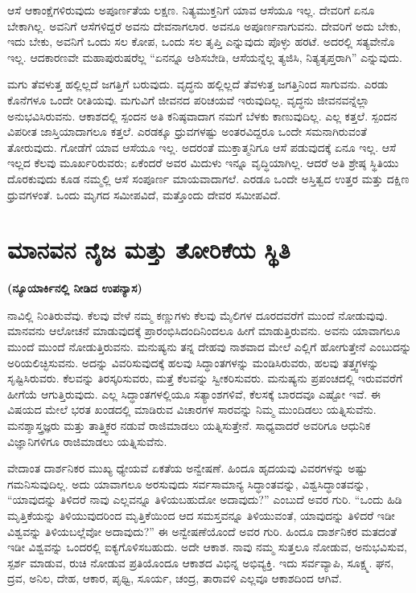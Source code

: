 ಆಸೆ ಆಕಾಂಕ್ಷೆಗಳಿರುವುದು ಅಪೂರ್ಣತೆಯ ಲಕ್ಷಣ. ನಿತ್ಯಮುಕ್ತನಿಗೆ ಯಾವ ಆಸೆಯೂ ಇಲ್ಲ. ದೇವರಿಗೆ ಏನೂ ಬೇಕಾಗಿಲ್ಲ. ಅವನಿಗೆ ಆಸೆಗಳಿದ್ದರೆ ಅವನು ದೇವನಾಗಲಾರ. ಅವನೂ ಅಪೂರ್ಣನಾಗುವನು. ದೇವರಿಗೆ ಅದು ಬೇಕು, ಇದು ಬೇಕು, ಅವನಿಗೆ ಒಂದು ಸಲ ಕೋಪ, ಒಂದು ಸಲ ತೃಪ್ತಿ ಎನ್ನುವುದು ಪೊಳ್ಳು ಹರಟೆ. ಅದರಲ್ಲಿ ಸತ್ಯವೇನೊ ಇಲ್ಲ. ಆದಕಾರಣವೇ ಮಹಾಪುರುಷರೆಲ್ಲ “ಏನನ್ನೂ ಆಶಿಸಬೇಡಿ, ಆಸೆಯನ್ನೆಲ್ಲ ತ್ಯಜಿಸಿ, ನಿತ್ಯತೃಪ್ತರಾಗಿ” ಎನ್ನುವುದು.

ಮಗು ತೆವಳುತ್ತ ಹಲ್ಲಿಲ್ಲದೆ ಜಗತ್ತಿಗೆ ಬರುವುದು. ವೃದ್ಧನು ಹಲ್ಲಿಲ್ಲದೆ ತೆವಳುತ್ತ ಜಗತ್ತಿನಿಂದ ಸಾಗುವನು. ಎರಡು ಕೊನೆಗಳೂ ಒಂದೇ ರೀತಿಯವು. ಮಗುವಿಗೆ ಜೀವನದ ಪರಿಚಯವೆ ಇರುವುದಿಲ್ಲ. ವೃದ್ಧನು ಜೀವನವನ್ನೆಲ್ಲಾ ಅನುಭವಿಸಿರುವನು. ಆಕಾಶದಲ್ಲಿ ಸ್ಪಂದನ ಅತಿ ಕನಿಷ್ಠವಾದಾಗ ನಮಗೆ ಬೆಳಕು ಕಾಣುವುದಿಲ್ಲ. ಎಲ್ಲ ಕತ್ತಲೆ. ಸ್ಪಂದನ ವಿಪರೀತ ಜಾಸ್ತಿಯಾದಾಗಲೂ ಕತ್ತಲೆ. ಎರಡಕ್ಕೂ ಧ್ರುವಗಳಷ್ಟು ಅಂತರವಿದ್ದರೂ ಒಂದೇ ಸಮನಾಗಿರುವಂತೆ ತೋರುವುದು. ಗೋಡೆಗೆ ಯಾವ ಆಸೆಯೂ ಇಲ್ಲ. ಅದರಂತೆ ಮುಕ್ತಾತ್ಮನಿಗೂ ಆಸೆ ಪಡುವುದಕ್ಕೆ ಏನೂ ಇಲ್ಲ. ಆಸೆ ಇಲ್ಲದ ಕೆಲವು ಮೂರ್ಖರಿರುವರು; ಏಕೆಂದರೆ ಅವರ ಮಿದುಳು ಇನ್ನೂ ವೃದ್ಧಿಯಾಗಿಲ್ಲ. ಆದರೆ ಅತಿ ಶ್ರೇಷ್ಠ ಸ್ಥಿತಿಯು ದೊರಕುವುದು ಕೂಡ ನಮ್ಮಲ್ಲಿ ಆಸೆ ಸಂಪೂರ್ಣ ಮಾಯವಾದಾಗಲೆ. ಎರಡೂ ಒಂದೇ ಅಸ್ತಿತ್ವದ ಉತ್ತರ ಮತ್ತು ದಕ್ಷಿಣ ಧ್ರುವಗಳಂತೆ. ಒಂದು ಮೃಗದ ಸಮೀಪವಿದೆ, ಮತ್ತೊಂದು ದೇವರ ಸಮೀಪವಿದೆ.

\chapter{ಮಾನವನ ನೈಜ ಮತ್ತು ತೋರಿಕೆಯ ಸ್ಥಿತಿ}%

\centerline{\textbf{(ನ್ಯೂಯಾರ್ಕಿನಲ್ಲಿ ನೀಡಿದ ಉಪನ್ಯಾಸ)}}

ನಾವಿಲ್ಲಿ ನಿಂತಿರುವೆವು. ಕೆಲವು ವೇಳೆ ನಮ್ಮ ಕಣ್ಣುಗಳು ಕೆಲವು ಮೈಲಿಗಳ ದೂರದವರೆಗೆ ಮುಂದೆ ನೋಡುವುವು. ಮಾನವನು ಆಲೋಚನೆ ಮಾಡುವುದಕ್ಕೆ ಪ್ರಾರಂಭಿಸಿದಂದಿನಿಂದಲೂ ಹೀಗೆ ಮಾಡುತ್ತಿರುವನು. ಅವನು ಯಾವಾಗಲೂ ಮುಂದೆ ಮುಂದೆ ನೋಡುತ್ತಿರುವನು. ಮನುಷ್ಯನು ತನ್ನ ದೇಹವು ನಾಶವಾದ ಮೇಲೆ ಎಲ್ಲಿಗೆ ಹೋಗುತ್ತೇನೆ ಎಂಬುದನ್ನು ಅರಿಯಲಿಚ್ಛಿಸುವನು. ಅದನ್ನು ವಿವರಿಸುವುದಕ್ಕೆ ಹಲವು ಸಿದ್ಧಾಂತಗಳನ್ನು ಮಂಡಿಸಿರುವರು, ಹಲವು ತತ್ತ್ವಗಳನ್ನು ಸೃಷ್ಟಿಸಿರುವರು. ಕೆಲವನ್ನು ತಿರಸ್ಕರಿಸುವರು, ಮತ್ತೆ ಕೆಲವನ್ನು ಸ್ವೀಕರಿಸುವರು. ಮನುಷ್ಯನು ಪ್ರಪಂಚದಲ್ಲಿ ಇರುವವರೆಗೆ ಹೀಗೆಯೆ ಆಗುತ್ತಿರುವುದು. ಎಲ್ಲ ಸಿದ್ಧಾಂತಗಳಲ್ಲಿಯೂ ಸತ್ಯಾಂಶಗಳಿವೆ, ಕೆಲಸಕ್ಕೆ ಬಾರದವೂ ಎಷ್ಟೋ ಇವೆ. ಈ ವಿಷಯದ ಮೇಲೆ ಭರತ ಖಂಡದಲ್ಲಿ ಮಾಡಿರುವ ವಿಚಾರಗಳ ಸಾರವನ್ನು ನಿಮ್ಮ ಮುಂದಿಡಲು ಯತ್ನಿಸುವೆನು. ಮನಶ್ಶಾಸ್ತ್ರಜ್ಞರು ಮತ್ತು ತಾತ್ತ್ವಿಕರ ನಡುವೆ ರಾಜಿಮಾಡಲು ಯತ್ನಿಸುತ್ತೇನೆ. ಸಾಧ್ಯವಾದರೆ ಅವರಿಗೂ ಆಧುನಿಕ ವಿಜ್ಞಾನಿಗಳಿಗೂ ರಾಜಿಮಾಡಲು ಯತ್ನಿಸುವೆನು.

ವೇದಾಂತ ದಾರ್ಶನಿಕರ ಮುಖ್ಯ ಧ್ಯೇಯವೆ ಏಕತೆಯ ಅನ್ವೇಷಣೆ. ಹಿಂದೂ ಹೃದಯವು ವಿವರಗಳನ್ನು ಅಷ್ಟು ಗಮನಿಸುವುದಿಲ್ಲ. ಅದು ಯಾವಾಗಲೂ ಅರಸುವುದು ಸರ್ವಸಾಮಾನ್ಯ ಸಿದ್ಧಾಂತವನ್ನು, ವಿಶ್ವಸಿದ್ಧಾಂತವನ್ನು, “ಯಾವುದನ್ನು ತಿಳಿದರೆ ನಾವು ಎಲ್ಲವನ್ನೂ ತಿಳಿಯಬಹುದೋ ಅದಾವುದು?” ಎಂಬುದೆ ಅವರ ಗುರಿ. “ಒಂದು ಹಿಡಿ ಮೃತ್ತಿಕೆಯನ್ನು ತಿಳಿಯುವುದರಿಂದ ಮೃತ್ತಿಕೆಯಿಂದ ಆದ ಸಮಸ್ತವನ್ನೂ ತಿಳಿಯುವಂತೆ, ಯಾವುದನ್ನು ತಿಳಿದರೆ ಇಡೀ ವಿಶ್ವವನ್ನು ತಿಳಿಯಬಲ್ಲೆವೋ ಅದಾವುದು?” ಈ ಅನ್ವೇಷಣೆಯೊಂದೆ ಅವರ ಗುರಿ. ಹಿಂದೂ ದಾರ್ಶನಿಕರ ಮತದಂತೆ ಇಡೀ ವಿಶ್ವವನ್ನು ಒಂದರಲ್ಲಿ ಐಕ್ಯಗೊಳಿಸಬಹುದು. ಅದೇ ಆಕಾಶ. ನಾವು ನಮ್ಮ ಸುತ್ತಲೂ ನೋಡುವ, ಅನುಭವಿಸುವ, ಸ್ಪರ್ಶ ಮಾಡುವ, ರುಚಿ ನೋಡುವ ಪ್ರತಿಯೊಂದೂ ಆಕಾಶದ ವಿಭಿನ್ನ ಅಭಿವ್ಯಕ್ತಿ. ಇದು ಸರ್ವವ್ಯಾಪಿ, ಸೂಕ್ಷ್ಮ. ಘನ, ದ್ರವ, ಅನಿಲ, ದೇಹ, ಆಕಾರ, ಪೃಥ್ವಿ, ಸೂರ್ಯ, ಚಂದ್ರ, ತಾರಾವಳಿ ಎಲ್ಲವೂ ಆಕಾಶದಿಂದ ಆಗಿವೆ.

